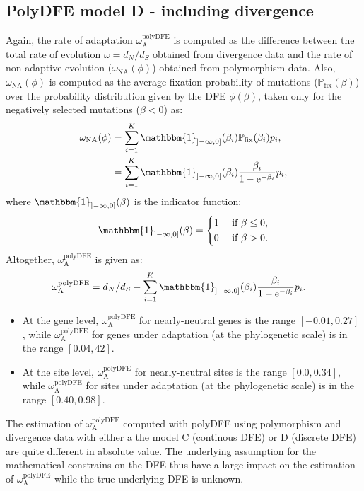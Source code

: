 \documentclass{article}
\newcommand{\e}{\mathrm{e}}
\newcommand{\dn}{d_N}
\newcommand{\ds}{d_S}
\newcommand{\dnds}{\dn / \ds}
\newcommand{\rateApop}{\omega_{\mathrm{A}}}
\newcommand{\proba}{\mathbb{P}}
\newcommand{\pfix}{\proba_{\mathrm{fix}}}
\newcommand{\Spop}{\beta}
\begin{document}
    \subsection{PolyDFE model D - including divergence}
    Again, the rate of adaptation $\rateApop^{\mathrm{polyDFE}}$ is computed as the difference between the total rate of evolution $\omega=\dnds$ obtained from divergence data and the rate of non-adaptive evolution ($\omega_{\mathrm{NA}}(\phi)$) obtained from polymorphism data.
    Also, $\omega_{\mathrm{NA}}(\phi)$ is computed as the average fixation probability of mutations ($\pfix (\Spop)$) over the probability distribution given by the DFE $\phi (\Spop)$, taken only for the negatively selected mutations ($\Spop < 0$) as:
    \begin{align}
        \omega_{\mathrm{NA}}(\phi) &= \sum_{i=1}^{K} \mathbbm{1}_{]-\infty, 0]}(\Spop_i) \pfix (\Spop_i) p_i,  \\
        &= \sum_{i=1}^{K} \mathbbm{1}_{]-\infty, 0]}(\Spop_i) \frac{\Spop_i}{1 - \e^{-\Spop_i}} p_i,
    \end{align}
    where $\mathbbm{1}_{]-\infty, 0]}(\Spop)$ is the indicator function:
    \begin{equation}
        \mathbbm{1}_{]-\infty, 0]}(\Spop) =
        \begin{dcases}
            1 & \text{ if $\Spop \leq 0$,} \\
            0 & \text{ if $\Spop > 0$.} \\
        \end{dcases}
    \end{equation}
    Altogether, $\rateApop^{\mathrm{polyDFE}}$ is given as:
    \begin{align}
        \rateApop^{\mathrm{polyDFE}} &= \dnds - \sum_{i=1}^{K} \mathbbm{1}_{]-\infty, 0]}(\Spop_i) \frac{\Spop_i}{1 - \e^{-\Spop_i}} p_i.
    \end{align}
    \newpage
    

    \begin{itemize}
        \item At the gene level, $\rateApop^{\mathrm{polyDFE}}$ for nearly-neutral genes is the range $[-0.01,0.27]$, while $\rateApop^{\mathrm{polyDFE}}$ for genes under adaptation (at the phylogenetic scale) is in the range $[0.04,42]$.
        \item At the site level, $\rateApop^{\mathrm{polyDFE}}$ for nearly-neutral sites is the range $[0.0,0.34]$, while $\rateApop^{\mathrm{polyDFE}}$ for sites under adaptation (at the phylogenetic scale) is in the range $[0.40,0.98]$.
    \end{itemize}
    The estimation of $\rateApop^{\mathrm{polyDFE}}$ computed with polyDFE using polymorphism and divergence data with either a the model C (continous DFE) or D (discrete DFE) are quite different in absolute value.
    The underlying assumption for the mathematical constrains on the DFE thus have a large impact on the estimation of $\rateApop^{\mathrm{polyDFE}}$ while the true underlying
    DFE is unknown.

    \pagebreak

    \printbibliography
\end{document}
